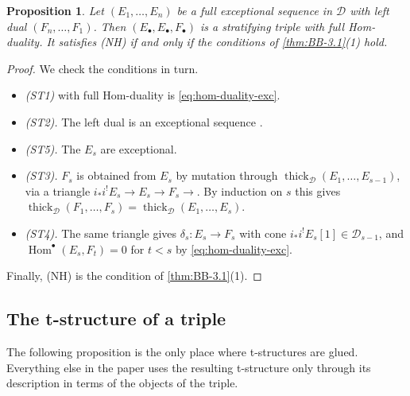 \documentclass[11pt,reqno]{amsart}
\theoremstyle{plain}
\newtheorem{proposition}[theorem]{Proposition}
\theoremstyle{definition}
\theoremstyle{remark}
\DeclareMathOperator{\Hom}{Hom}
\newcommand{\thick}[2][\cD]{\operatorname{thick}_{#1}(#2)}
\newcommand{\cD}{\mathcal{D}}
\begin{document}
\begin{proposition}\label{prop:exc-dual}
Let $(E_1,\dots,E_n)$ be a full exceptional sequence in $\cD$ with left dual $(F_n,\dots,F_1)$. Then $(E_\bullet,E_\bullet,F_\bullet)$ is a stratifying triple with full Hom-duality. It satisfies (NH) if and only if the conditions of \cref{thm:BB-3.1}(1) hold.
\end{proposition}

\begin{proof}
We check the conditions in turn.
\begin{itemize}
\item \emph{(ST1)} with full Hom-duality is \eqref{eq:hom-duality-exc}.
\item \emph{(ST2).} The left dual is an exceptional sequence \cite{Bon89}.
\item \emph{(ST5).} The $E_s$ are exceptional.
\item \emph{(ST3).} $F_s$ is obtained from $E_s$ by mutation through $\thick{E_1,\dots,E_{s-1}}$, via a triangle $i_*i^!E_s\to E_s\to F_s\to$. By induction on $s$ this gives $\thick{F_1,\dots,F_s}=\thick{E_1,\dots,E_s}$.
\item \emph{(ST4).} The same triangle gives $\delta_s\colon E_s\to F_s$ with cone $i_*i^!E_s[1]\in\cD_{s-1}$, and $\Hom^\bullet(E_s,F_t)=0$ for $t<s$ by \eqref{eq:hom-duality-exc}.
\end{itemize}
Finally, (NH) is the condition of \cref{thm:BB-3.1}(1).
\end{proof}

\subsection{The t-structure of a triple}
The following proposition is the only place where t-structures are glued. Everything else in the paper uses the resulting t-structure only through its description in terms of the objects of the triple.
\end{document}
